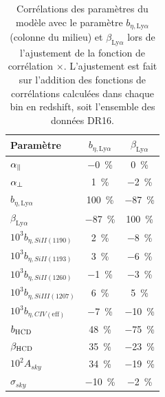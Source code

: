 \documentclass[11pt, twoside, a4paper, openright]{report}
\begin{document}
\begin{table}[]
  \centering
  \caption{Corrélations des paramètres du modèle avec le paramètre $b_{\eta,\mathrm{Ly}\alpha}$ (colonne du milieu) et $\beta_{\mathrm{Ly}\alpha}$ lors de l'ajustement de la fonction de corrélation \lya{}$\times$\lya{}. L'ajustement est fait sur l'addition des fonctions de corrélations calculées dans chaque bin en redshift, soit l'ensemble des données DR16.}
  \label{tab:corr_bias_lya}
  \begin{tabular}{lcc}
    \toprule
    Paramètre  & $b_{\eta,\mathrm{Ly}\alpha}$ & $\beta_{\mathrm{Ly}\alpha}$ \\
    \midrule
    $\alpha_{\parallel}{} $ & \SI{-0}{\percent} & \SI{0}{\percent}\\
    $\alpha_{\perp}{} $ & \SI{1}{\percent} & \SI{-2}{\percent} \\
    $b_{\eta, \mathrm{Ly}\alpha} $ & \SI{100}{\percent} & \SI{-87}{\percent} \\
    $\beta_{\mathrm{Ly}\alpha} $ & \SI{-87}{\percent} &  \SI{100}{\percent} \\
    $10^3 b_{\eta, SiII(1190)} $ & \SI{2}{\percent} & \SI{-8}{\percent} \\
    $10^3 b_{\eta, SiII(1193)} $ & \SI{3}{\percent} & \SI{-6}{\percent} \\
    $10^3 b_{\eta, SiII(1260)} $ & \SI{-1}{\percent} & \SI{-3}{\percent} \\
    $10^3 b_{\eta, SiIII(1207)} $ & \SI{6}{\percent} & \SI{5}{\percent}\\
    $10^3 b_{\eta, CIV(\mathrm{eff})} $ &\SI{-7}{\percent} & \SI{-10}{\percent}\\
    $b_{\textsc{HCD}} $ & \SI{48}{\percent} & \SI{-75}{\percent}\\
    $\beta_{\textsc{HCD}} $ & \SI{35}{\percent} & \SI{-23}{\percent}\\
    $10^2 A_{sky} $ & \SI{34}{\percent} & \SI{-19}{\percent}\\
    $\sigma_{sky} $ & \SI{-10}{\percent} & \SI{-2}{\percent}\\
    \bottomrule
\end{tabular}
\end{table}
\end{document}
